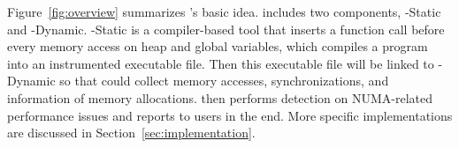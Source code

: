 Figure~\ref{fig:overview} summarizes \NP{}'s basic idea.  \NP{} includes two components, \NP{}-Static and \NP{}-Dynamic. \NP{}-Static is a compiler-based tool that inserts a function call before every memory access on heap and global variables, which compiles a program into an instrumented executable file. Then this executable file will be linked to \NP{}-Dynamic so that \NP{} could collect memory accesses, synchronizations, and information of memory allocations. \NP{} then performs detection on NUMA-related performance issues and reports to users in the end.  More specific implementations are discussed in Section~\ref{sec:implementation}. 

